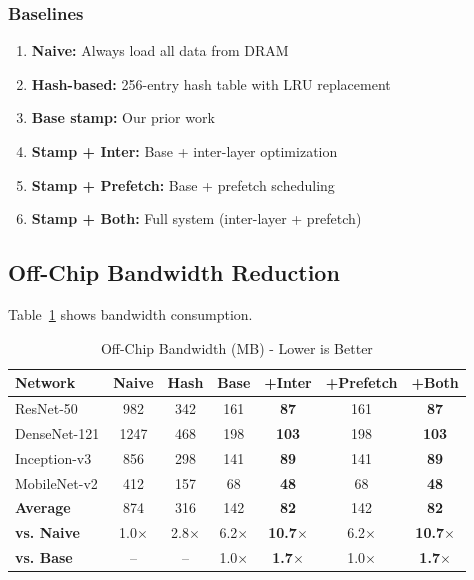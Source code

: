 \documentclass[journal]{IEEEtran}
\begin{document}
\subsubsection{Baselines}
\begin{enumerate}
\item \textbf{Naive:} Always load all data from DRAM
\item \textbf{Hash-based:} 256-entry hash table with LRU replacement
\item \textbf{Base stamp:} Our prior work~\cite{stampconf2026}
\item \textbf{Stamp + Inter:} Base + inter-layer optimization
\item \textbf{Stamp + Prefetch:} Base + prefetch scheduling
\item \textbf{Stamp + Both:} Full system (inter-layer + prefetch)
\end{enumerate}

\subsection{Off-Chip Bandwidth Reduction}

Table~\ref{tab:bandwidth_results} shows bandwidth consumption.

\begin{table}[t]
\centering
\caption{Off-Chip Bandwidth (MB) - Lower is Better}
\label{tab:bandwidth_results}
\small
\begin{tabular}{lcccccc}
\toprule
\textbf{Network} & \textbf{Naive} & \textbf{Hash} & \textbf{Base} & \textbf{+Inter} & \textbf{+Prefetch} & \textbf{+Both} \\
\midrule
ResNet-50 & 982 & 342 & 161 & \textbf{87} & 161 & \textbf{87} \\
DenseNet-121 & 1247 & 468 & 198 & \textbf{103} & 198 & \textbf{103} \\
Inception-v3 & 856 & 298 & 141 & \textbf{89} & 141 & \textbf{89} \\
MobileNet-v2 & 412 & 157 & 68 & \textbf{48} & 68 & \textbf{48} \\
\midrule
\textbf{Average} & 874 & 316 & 142 & \textbf{82} & 142 & \textbf{82} \\
\textbf{vs. Naive} & 1.0$\times$ & 2.8$\times$ & 6.2$\times$ & \textbf{10.7$\times$} & 6.2$\times$ & \textbf{10.7$\times$} \\
\textbf{vs. Base} & -- & -- & 1.0$\times$ & \textbf{1.7$\times$} & 1.0$\times$ & \textbf{1.7$\times$} \\
\bottomrule
\end{tabular}
\end{table}
\end{document}
